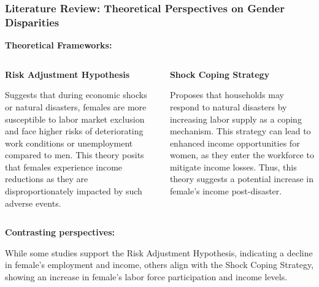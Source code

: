 \documentclass[serif, aspectratio=169]{beamer}
\newcommand{\returnbutton}[2]{%
  \vspace{-1.0cm}  %
  \hfill  %
  \hyperlink{#1}{%
    {\footnotesize\beamerbutton{#2}}%
  }%
  \vspace{0.3cm}  %
}
\begin{document}
\begin{frame}[label=theoretical_perspective]
\frametitle{Literature Review: Theoretical Perspectives on Gender Disparities}

\vspace{0.2cm}

\returnbutton{literature_review2}{Return}

    \textbf{Theoretical Frameworks:}
    
    \vspace{0.1cm}
    
    \begin{columns}[T] %
        \begin{column}{0.48\textwidth}
            \textbf{Risk Adjustment Hypothesis}
            
            \vspace{0.1cm}
            
            Suggests that during economic shocks or natural disasters, females are more susceptible to labor market exclusion and face higher risks of deteriorating work conditions or unemployment compared to men. This theory posits that females experience income reductions as they are disproportionately impacted by such adverse events.
        \end{column}
        \hfill
        \begin{column}{0.48\textwidth}
            \textbf{Shock Coping Strategy}
            
            \vspace{0.1cm}
            
            Proposes that households may respond to natural disasters by increasing labor supply as a coping mechanism. This strategy can lead to enhanced income opportunities for women, as they enter the workforce to mitigate income losses. Thus, this theory suggests a potential increase in female's income post-disaster.
        \end{column}
    \end{columns}
    
    \vspace{0.3cm}
    
    \textbf{Contrasting perspectives:}
    
    While some studies support the Risk Adjustment Hypothesis, indicating a decline in female's employment and income, others align with the Shock Coping Strategy, showing an increase in female's labor force participation and income levels.

\end{frame}
\end{document}
